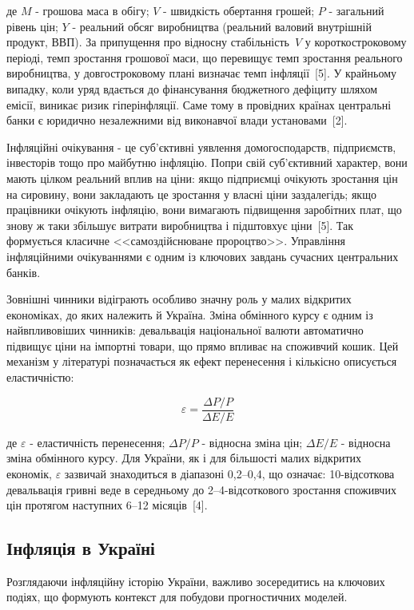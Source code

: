 \documentclass[a4paper,ukrainian,oneside]{extreport}
\begin{document}
де $M$ - грошова маса в обігу; $V$ - швидкість обертання грошей; $P$ - загальний рівень цін; $Y$ - реальний обсяг виробництва (реальний валовий внутрішній продукт, ВВП). За припущення про відносну стабільність~$V$ у короткостроковому періоді, темп зростання грошової маси, що перевищує темп зростання реального виробництва, у довгостроковому плані визначає темп інфляції~[5]. У крайньому випадку, коли уряд вдається до фінансування бюджетного дефіциту шляхом емісії, виникає ризик гіперінфляції. Саме тому в провідних країнах центральні банки є юридично незалежними від виконавчої влади установами~[2].

Інфляційні очікування - це суб'єктивні уявлення домогосподарств, підприємств, інвесторів тощо про майбутню інфляцію. Попри свій суб'єктивний характер, вони мають цілком реальний вплив на ціни: якщо підприємці очікують зростання цін на сировину, вони закладають це зростання у власні ціни заздалегідь; якщо працівники очікують інфляцію, вони вимагають підвищення заробітних плат, що знову ж таки збільшує витрати виробництва і підштовхує ціни~[5]. Так формується класичне <<самоздійснюване пророцтво>>. Управління інфляційними очікуваннями є одним із ключових завдань сучасних центральних банків.

Зовнішні чинники відіграють особливо значну роль у малих відкритих економіках, до яких належить й Україна. Зміна обмінного курсу є одним із найвпливовіших чинників: девальвація національної валюти автоматично підвищує ціни на імпортні товари, що прямо впливає на споживчий кошик. Цей механізм у літературі позначається як ефект перенесення і кількісно описується еластичністю:

\begin{equation}
\varepsilon = \frac{\Delta P/P}{\Delta E/E}
\end{equation}

де $\varepsilon$ - еластичність перенесення; $\Delta P/P$ - відносна зміна цін; $\Delta E/E$ - відносна зміна обмінного курсу. Для України, як і для більшості малих відкритих економік, $\varepsilon$ зазвичай знаходиться в діапазоні 0,2--0,4, що означає: 10-відсоткова девальвація гривні веде в середньому до 2--4-відсоткового зростання споживчих цін протягом наступних 6--12 місяців~[4].

\subsection{Інфляція в Україні}

Розглядаючи інфляційну історію України, важливо зосередитись на ключових подіях, що формують контекст для побудови прогностичних моделей.
\end{document}
